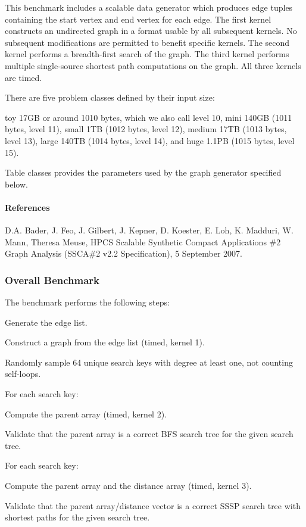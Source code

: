 \documentclass{article}
\begin{document}
This benchmark includes a scalable data generator which produces edge tuples containing the start vertex and end vertex for each edge. The first kernel constructs an undirected graph in a format usable by all subsequent kernels. No subsequent modifications are permitted to benefit specific kernels. The second kernel performs a breadth-first search of the graph. The third kernel performs multiple single-source shortest path computations on the graph. All three kernels are timed.

There are five problem classes defined by their input size:

toy 17GB or around 1010 bytes, which we also call level 10, mini 140GB (1011 bytes, level 11), small 1TB (1012 bytes, level 12), medium 17TB (1013 bytes, level 13), large 140TB (1014 bytes, level 14), and huge 1.1PB (1015 bytes, level 15).

Table classes provides the parameters used by the graph generator specified below.

\paragraph*{References}

D.A. Bader, J. Feo, J. Gilbert, J. Kepner, D. Koester, E. Loh, K. Madduri, W. Mann, Theresa Meuse, HPCS Scalable Synthetic Compact Applications \#2 Graph Analysis (SSCA\#2 v2.2 Specification), 5 September 2007.

\subsubsection*{Overall Benchmark}

The benchmark performs the following steps:

Generate the edge list.

Construct a graph from the edge list (timed, kernel 1).

Randomly sample 64 unique search keys with degree at least one, not counting self-loops.

For each search key:

Compute the parent array (timed, kernel 2).

Validate that the parent array is a correct BFS search tree for the given search tree.

For each search key:

Compute the parent array and the distance array (timed, kernel 3).

Validate that the parent array/distance vector is a correct SSSP search tree with shortest paths for the given search tree.
\end{document}
